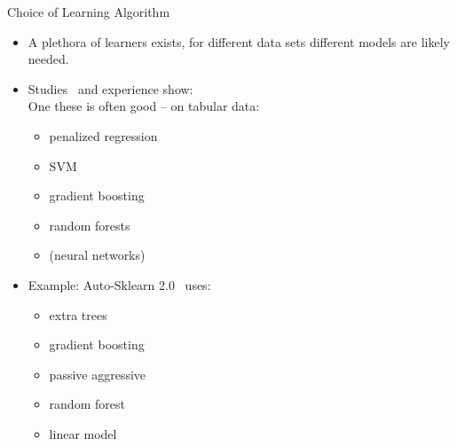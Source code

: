 \begin{frame}{Choice of Learning Algorithm}
  \begin{itemize}
    \item A plethora of learners exists, for different data sets different models
        are likely needed.
        
    \item Studies~ and experience show:\\
        One these is often good -- on tabular data:
    \begin{itemize}
      \item penalized regression
      \item SVM
      \item gradient boosting
       \item random forests
     \item (neural networks)
  \end{itemize}
      \item Example: Auto-Sklearn 2.0~  uses: 
    \begin{itemize}
        \item extra trees 
         \item gradient boosting 
         \item passive aggressive 
        \item random forest 
        \item linear model
  \end{itemize}
    \end{itemize}
\end{frame}

